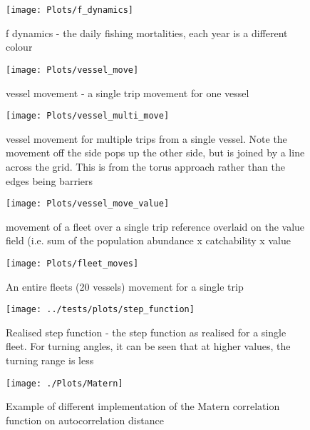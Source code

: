 \documentclass[review]{elsarticle}
\begin{document}
\begin{figure}[!ht]
	\texttt{[image: Plots/f\_dynamics]}
	\caption{f dynamics - the daily fishing mortalities, each year is a
		different colour}
	\label{fig:10}
\end{figure}	

\begin{figure}[!ht]
	\texttt{[image: Plots/vessel\_move]}
	\caption{vessel movement - a single trip movement for one vessel}
	\label{fig:11}
\end{figure}	

\begin{figure}[!ht]
\texttt{[image: Plots/vessel\_multi\_move]}
	\caption{vessel movement for multiple trips from a single vessel. Note
	the movement off the side pops up the other side, but is joined by a
	line across the grid. This is from the torus approach rather than the
	edges being barriers}
	\label{fig:12}
\end{figure}	

\begin{figure}[!ht]
	\texttt{[image: Plots/vessel\_move\_value]}
	\caption{movement of a fleet over a single trip reference overlaid on the
		value field (i.e. sum of the population abundance x catchability x value}
	\label{fig:13}
\end{figure}	

\begin{figure}[!ht]
	\texttt{[image: Plots/fleet\_moves]}
	\caption{An entire fleets (20 vessels) movement for a single trip}
	\label{fig:14}
\end{figure}	

\begin{figure}[!ht]
	\texttt{[image: ../tests/plots/step\_function]}
	\caption{Realised step function - the step function as realised for a
		single fleet. For turning angles, it can be seen that at higher
	values, the turning range is less}
	\label{fig:15}
\end{figure}	

\begin{figure}[!ht]
	\texttt{[image: ./Plots/Matern]}
	\caption{Example of different implementation of the Matern correlation
	function on autocorrelation distance}
	\label{fig:16}
\end{figure}	
\end{document}
